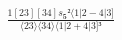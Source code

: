 \documentclass[varwidth, border=5pt]{standalone}
\begin{document}
\begin{my}
$\begin{gathered}
\scriptscriptstyle\frac{1[23][34]s_{𝟓}²⟨1|2-4|3]}{⟨23⟩⟨34⟩⟨1|2+4|3]³}
\end{gathered}$
\end{my}
\end{document}
